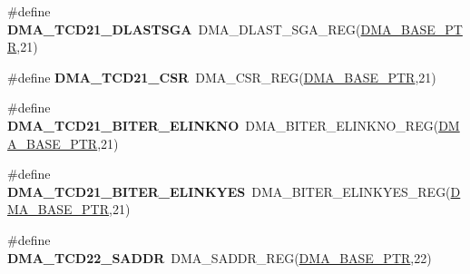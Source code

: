 \begin{DoxyCompactItemize}
\item 
\hypertarget{group___d_m_a___register___accessor___macros_ga02686792fec9d1ea3de7efe7a2dd44fb}{}\#define {\bfseries D\+M\+A\+\_\+\+T\+C\+D21\+\_\+\+D\+L\+A\+S\+T\+S\+G\+A}~D\+M\+A\+\_\+\+D\+L\+A\+S\+T\+\_\+\+S\+G\+A\+\_\+\+R\+E\+G(\hyperlink{group___d_m_a___peripheral_ga6997fbc1b1973e9f27170217a3bd6f22}{D\+M\+A\+\_\+\+B\+A\+S\+E\+\_\+\+P\+T\+R},21)\label{group___d_m_a___register___accessor___macros_ga02686792fec9d1ea3de7efe7a2dd44fb}

\item 
\hypertarget{group___d_m_a___register___accessor___macros_ga009cad35dad4d65677aa0ce7f468bc14}{}\#define {\bfseries D\+M\+A\+\_\+\+T\+C\+D21\+\_\+\+C\+S\+R}~D\+M\+A\+\_\+\+C\+S\+R\+\_\+\+R\+E\+G(\hyperlink{group___d_m_a___peripheral_ga6997fbc1b1973e9f27170217a3bd6f22}{D\+M\+A\+\_\+\+B\+A\+S\+E\+\_\+\+P\+T\+R},21)\label{group___d_m_a___register___accessor___macros_ga009cad35dad4d65677aa0ce7f468bc14}

\item 
\hypertarget{group___d_m_a___register___accessor___macros_gaa053960dbbe90570465b3634584a4021}{}\#define {\bfseries D\+M\+A\+\_\+\+T\+C\+D21\+\_\+\+B\+I\+T\+E\+R\+\_\+\+E\+L\+I\+N\+K\+N\+O}~D\+M\+A\+\_\+\+B\+I\+T\+E\+R\+\_\+\+E\+L\+I\+N\+K\+N\+O\+\_\+\+R\+E\+G(\hyperlink{group___d_m_a___peripheral_ga6997fbc1b1973e9f27170217a3bd6f22}{D\+M\+A\+\_\+\+B\+A\+S\+E\+\_\+\+P\+T\+R},21)\label{group___d_m_a___register___accessor___macros_gaa053960dbbe90570465b3634584a4021}

\item 
\hypertarget{group___d_m_a___register___accessor___macros_gae6f78f2356a005d23f2a711357b586f6}{}\#define {\bfseries D\+M\+A\+\_\+\+T\+C\+D21\+\_\+\+B\+I\+T\+E\+R\+\_\+\+E\+L\+I\+N\+K\+Y\+E\+S}~D\+M\+A\+\_\+\+B\+I\+T\+E\+R\+\_\+\+E\+L\+I\+N\+K\+Y\+E\+S\+\_\+\+R\+E\+G(\hyperlink{group___d_m_a___peripheral_ga6997fbc1b1973e9f27170217a3bd6f22}{D\+M\+A\+\_\+\+B\+A\+S\+E\+\_\+\+P\+T\+R},21)\label{group___d_m_a___register___accessor___macros_gae6f78f2356a005d23f2a711357b586f6}

\item 
\hypertarget{group___d_m_a___register___accessor___macros_ga7de16ebd72009c635846c7e3e20c75eb}{}\#define {\bfseries D\+M\+A\+\_\+\+T\+C\+D22\+\_\+\+S\+A\+D\+D\+R}~D\+M\+A\+\_\+\+S\+A\+D\+D\+R\+\_\+\+R\+E\+G(\hyperlink{group___d_m_a___peripheral_ga6997fbc1b1973e9f27170217a3bd6f22}{D\+M\+A\+\_\+\+B\+A\+S\+E\+\_\+\+P\+T\+R},22)\label{group___d_m_a___register___accessor___macros_ga7de16ebd72009c635846c7e3e20c75eb}


\end{DoxyCompactItemize}
